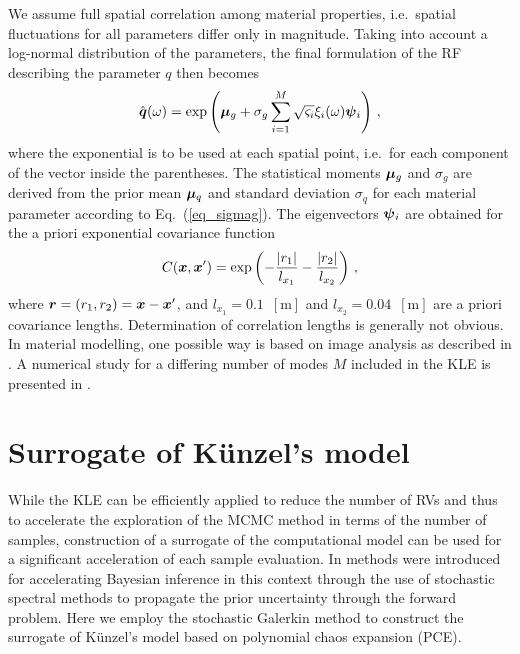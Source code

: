 \documentclass[preprint,12pt]{elsarticle}
\newcommand{\vek}[1]{\mathchoice{\displaystyle\boldsymbol#1}
{\textstyle\boldsymbol#1}{\scriptstyle\boldsymbol#1}
{\scriptscriptstyle\boldsymbol#1}}
\begin{document}
We assume full spatial correlation among material properties,
i.e.\ spatial fluctuations for all parameters differ only in
magnitude. Taking into account a log-normal distribution of the
parameters, the final formulation of the RF describing the
parameter $q$ then becomes
\begin{equation}
  \hat{\vek{q}}(\omega) = \exp \left( \vek{\mu}_g +
\sigma_g \sum_{i=1}^{M} \sqrt{\varsigma_i}\xi_i(\omega) \vek{\psi}_i
  \right) \, ,
\label{eq_logfield_ext}
\end{equation}
where the exponential is to be used at each spatial point, i.e.\
for each component of the vector inside the parentheses. The
statistical moments $\vek{\mu}_g$ and $\sigma_g$ are derived
  from the prior mean $\vek{\mu}_q$ and standard deviation $\sigma_q$
  for each material parameter according to Eq.~(\ref{eq_sigmag}). The
  eigenvectors $\vek{\psi}_i$ are obtained for the a priori
  exponential covariance function
\begin{equation}
C(\vek{x}, \vek{x}^{\prime}) = \exp \left( -\frac{|r_1|}{l_{x_{1}}} -
\frac{|r_2|}{l_{x_{2}}} \right)\, ,
\label{eq_normkern}
\end{equation}
where $\vek{r} = (r_1, r_2) = \vek{x} - \vek{x}^{\prime}$, and
$l_{x_{1}} = 0.1$~$\mathrm{[m]}$ and $l_{x_{2}} =
0.04$~$\mathrm{[m]}$ are a priori covariance lengths.
Determination of correlation lengths is generally not obvious. In
material modelling, one possible way is based on image analysis as
described in \cite{Lombardo:2009:IJMCE}. A numerical study for a
differing number of modes $M$ included in the KLE is presented in
\cite{Kucerova:2011:AMC}.

\section{Surrogate of K\"unzel's model}
\label{sec:pce}
While the KLE can be efficiently applied to reduce the number of RVs and
thus to accelerate the exploration of the MCMC method in terms of the
number of samples, construction of a surrogate of the computational
model can be used for a significant acceleration of each sample
evaluation. In \cite{Marzouk:2007:JCP, Marzouk:2009:JCP}
methods  were introduced for accelerating Bayesian inference in this
context through the use of stochastic spectral methods to propagate
the prior
uncertainty through the forward problem. Here we employ the
stochastic Galerkin method
\cite{Babuska:2004:SIAM, Matthies:2005:CMAME} to construct the
surrogate of K\"unzel's model based on polynomial chaos expansion
(PCE).
\end{document}
